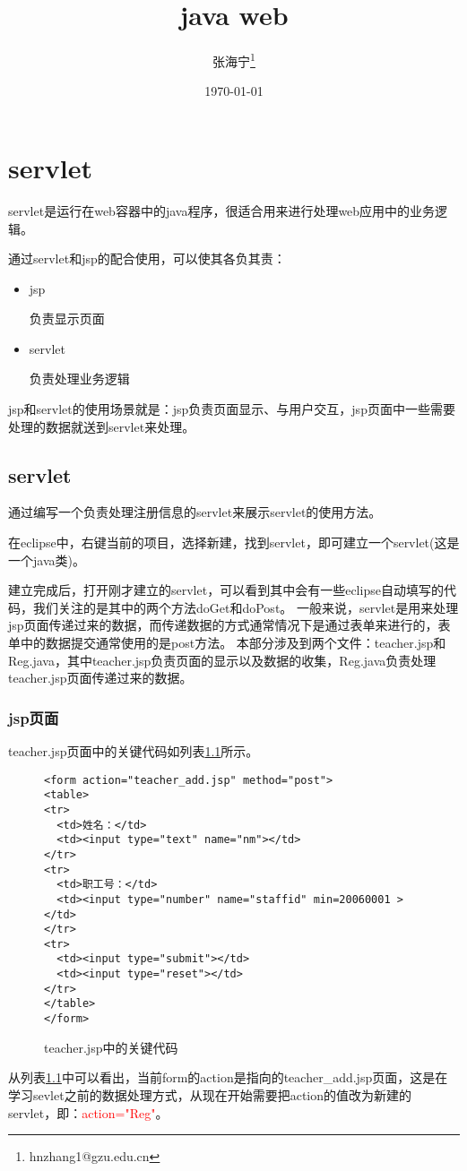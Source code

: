 \documentclass[a4paper]{book}
\begin{document}
\frontmatter
\title{java web}
\author{张海宁\thanks{hnzhang1@gzu.edu.cn}}
\date{\today}
\maketitle
\tableofcontents
\mainmatter
\chapter{servlet}
servlet是运行在web容器中的java程序，很适合用来进行处理web应用中的业务逻辑。

通过servlet和jsp的配合使用，可以使其各负其责：
\begin{itemize}
\item jsp

负责显示页面
\item servlet

负责处理业务逻辑
\end{itemize}
jsp和servlet的使用场景就是：jsp负责页面显示、与用户交互，jsp页面中一些需要处理的数据就送到servlet来处理。
\section{servlet}
通过编写一个负责处理注册信息的servlet来展示servlet的使用方法。

在eclipse中，右键当前的项目，选择新建，找到servlet，即可建立一个servlet(这是一个java类)。

建立完成后，打开刚才建立的servlet，可以看到其中会有一些eclipse自动填写的代码，我们关注的是其中的两个方法doGet和doPost。
一般来说，servlet是用来处理jsp页面传递过来的数据，而传递数据的方式通常情况下是通过表单来进行的，表单中的数据提交通常使用的是post方法。
本部分涉及到两个文件：teacher.jsp和Reg.java，其中teacher.jsp负责页面的显示以及数据的收集，Reg.java负责处理teacher.jsp页面传递过来的数据。
\subsection{jsp页面}
teacher.jsp页面中的关键代码如列表\ref{teacherjsp}所示。
\begin{figure}
\begin{lstlisting}
<form action="teacher_add.jsp" method="post">
<table>
<tr>
  <td>姓名：</td>
  <td><input type="text" name="nm"></td>
</tr>
<tr>
  <td>职工号：</td>
  <td><input type="number" name="staffid" min=20060001 ></td>
</tr>
<tr>
  <td><input type="submit"></td>
  <td><input type="reset"></td>
</tr>
</table>
</form>
\end{lstlisting}
\caption{teacher.jsp中的关键代码}
\label{teacherjsp}
\end{figure}
从列表\ref{teacherjsp}中可以看出，当前form的action是指向的teacher\_add.jsp页面，这是在学习sevlet之前的数据处理方式，从现在开始需要把action的值改为新建的servlet，即：\textcolor{red}{action="Reg"}。
\end{document}

